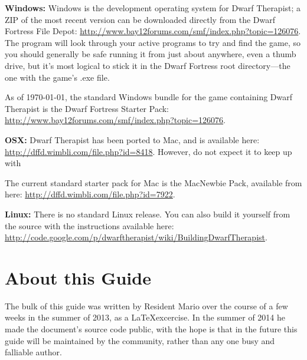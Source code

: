\documentclass[]{article}
\begin{document}
\indent\textbf{Windows:} Windows is the development operating system for Dwarf Therapist; a ZIP of the
most recent version can be downloaded directly from the Dwarf Fortress File Depot: 
\url{http://www.bay12forums.com/smf/index.php?topic=126076}. The program will look through your
active programs to try and find the game, so you should generally be safe running it from just about
anywhere, even a thumb drive, but it's most logical to stick it in the Dwarf Fortress root
directory---the one with the game's .exe file.

As of \today, the standard Windows bundle for the game containing Dwarf Therapist is the Dwarf Fortress
Starter Pack: \url{http://www.bay12forums.com/smf/index.php?topic=126076}.

\vspace{12pt}

\textbf{OSX:}
Dwarf Therapist has been ported to Mac, and is available here:
\url{http://dffd.wimbli.com/file.php?id=8418}. However, do not expect it to keep up with 

The current standard starter pack for Mac is the MacNewbie Pack, available from here:
\url{http://dffd.wimbli.com/file.php?id=7922}.
\vspace{12pt}

\textbf{Linux:}
There is no standard Linux release. You can also build it yourself from the source with the instructions
available here: \url{http://code.google.com/p/dwarftherapist/wiki/BuildingDwarfTherapist}.

\section{About this Guide}
\label{sec:About this Guide}

The bulk of this guide was written by Resident Mario over the course of a few weeks in the summer of
2013, as a \LaTeX \space excercise. In the summer of 2014 he made the document's source code public,
with the hope is that in the future this guide will be maintained by the community, rather than any one
busy and falliable author.
\end{document}
